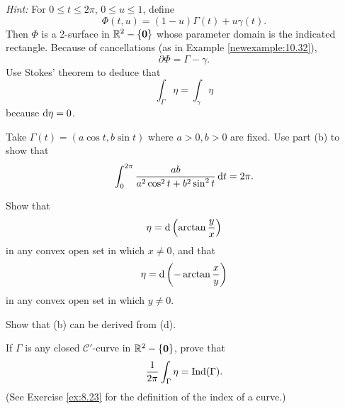 \begin{myexercise}
\begin{asparaenum}[(a)]
        \emph{Hint:} For $0 \leq t \leq 2\pi$, $0 \leq u \leq 1$, define 
        \begin{equation*}
            \Phi(t,u)=(1-u)\Gamma(t)+u\gamma(t).
        \end{equation*}
        Then $\Phi$ is a 2-surface in ${\protect\mathbb R}^2 - \{\mathbf{0}\}$ whose parameter domain is the indicated rectangle. 
        Because of cancellations (as in Example \ref{newexample:10.32}),
        \begin{equation*}
            \partial \Phi = \Gamma - \gamma .
        \end{equation*}
        Use Stokes' theorem to deduce that 
        \begin{equation*}
            \int_{\Gamma} \eta = 
            \int_{\gamma} \eta 
        \end{equation*}
        because $\d \eta = 0$.
        \item Take $\Gamma(t)=(a \cos t, b \sin t)$ where $a>0,b>0$ are fixed. Use part (b) to show that 
        \begin{equation*}
            \int_{0}^{2\pi} \frac{ab}{a^2\cos^2 t + b^2 \sin^2 t} \d t = 2 \pi .
        \end{equation*}
        \item Show that 
        \begin{equation*}
            \eta = \d \left( \arctan\frac{y}{x} \right)
        \end{equation*}
        in any convex open set in which $x \neq 0$, and that
        \begin{equation*}
            \eta = \d \left( -\arctan\frac{x}{y} \right)
        \end{equation*}
        in any convex open set in which $y \neq 0$.
        \item Show that (b) can be derived from (d).
        \item If $\Gamma$ is any closed $\mathscr{C}'$-curve in ${\protect\mathbb R}^2 - \{\mathbf{0}\}$, prove that
        \begin{equation*}
            \frac{1}{2\pi} \int_{\Gamma} \eta = \operatorname{\operatorname{Ind}} (\Gamma).
        \end{equation*}
        (See Exercise \ref{ex:8.23} for the definition of the index of a curve.)
    \end{asparaenum}
\end{myexercise}


